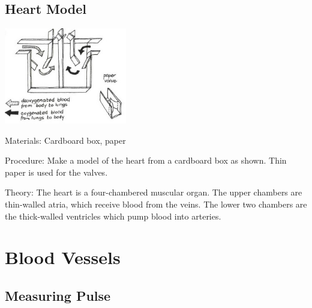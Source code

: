 \begin{multicols}{2}
\subsection{Heart Model} %

\begin{center}
\includegraphics[width=0.4\textwidth]{./img/vso/heart-model.jpg}
\end{center}

\begin{description*}
\item[Materials:]{Cardboard box, paper}
\item[Procedure:]{Make a model of the heart from a
cardboard box as shown. Thin
paper is used for the valves.}
\item[Theory:]{The heart is a four-chambered muscular organ. The upper chambers are thin-walled atria,
which receive blood from the veins. The lower two chambers are the thick-walled ventricles
which pump blood into arteries.}
\end{description*}


\section*{Blood Vessels}


\subsection{Measuring Pulse} %


\end{multicols}
